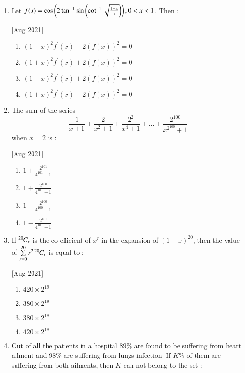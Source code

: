 \documentclass[journal,12pt,twocolumn]{IEEEtran}
\theoremstyle{remark}
\begin{document}
\begin{enumerate}
    \item Let $f(x)=\cos\left(2\tan^{-1}\sin\left(\cot^{-1}\sqrt{\frac{1-x}{x}}\right)\right), 0<x<1$. Then :
    
    \hfill[Aug 2021]
        \begin{enumerate}
            \item $(1-x)^2f^\prime(x)-2(f(x))^2=0$
            \item $(1+x)^2f^\prime(x)+2(f(x))^2=0$
            \item $(1-x)^2f^\prime(x)+2(f(x))^2=0$
            \item $(1+x)^2f^\prime(x)-2(f(x))^2=0$
        \end{enumerate}


    \item The sum of the series
        $$\frac{1}{x+1}+\frac{2}{x^2+1}+\frac{2^2}{x^4+1}+\dots+\frac{2^{100}}{x^{2^{100}}+1}$$ when $x=2$ is :
    
    \hfill[Aug 2021]
        \begin{enumerate}
            \item $1+\frac{2^{101}}{4^{101}-1}$
            \item $1+\frac{2^{100}}{4^{101}-1}$
            \item $1-\frac{2^{100}}{4^{100}-1}$
            \item $1-\frac{2^{101}}{4^{101}-1}$
        \end{enumerate}


    \item If ${{}^{20}\mkern-1muC_{r}}$ is the co-efficient of $x^r$ in the expansion of $(1+x)^{20}$, then the value of $\sum\limits_{r=0}^{20}r^2\,{{}^{20}\mkern-1muC_{r}}$ is equal to :
    
    \hfill[Aug 2021]
        \begin{enumerate}
            \item $420\times2^{19}$
            \item $380\times2^{19}$
            \item $380\times2^{18}$
            \item $420\times2^{18}$
        \end{enumerate}

    \item Out of all the patients in a hospital $89\%$ are found to be suffering from heart ailment and $98\%$ are suffering from lungs infection. If $K\%$ of them are suffering from both ailments, then $K$ can not belong to the set :
    

\end{enumerate}
\end{document}
